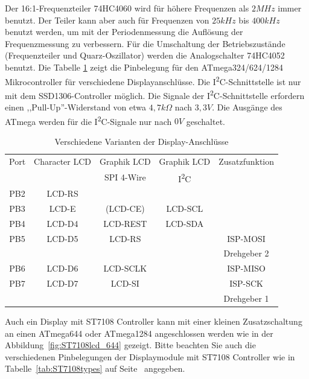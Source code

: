 Der 16:1-Frequenzteiler 74HC4060 wird für höhere Frequenzen als \(2MHz\) immer benutzt.
Der Teiler kann aber auch für Frequenzen von \(25kHz\) bis \(400kHz\) benutzt werden, um mit der
Periodenmessung die Auflösung der Frequenzmessung zu verbessern.
Für die Umschaltung der Betriebszustände (Frequenzteiler und Quarz-Oszillator) werden
die Analogschalter 74HC4052 benutzt.
Die Tabelle \ref{tab:mega644-display} zeigt die Pinbelegung für den ATmega324/624/1284 Mikrocontroller für verschiedene Displayanschlüsse.
Die I\textsuperscript{2}C-Schnittstelle ist nur mit dem SSD1306-Controller möglich.
Die Signale der I\textsuperscript{2}C-Schnittstelle erfordern einen ,,Pull-Up''-Widerstand von etwa \(4,7k\Omega\) nach \(3,3V\).
Die Ausgänge des ATmega werden für die I\textsuperscript{2}C-Signale nur nach \(0V\) geschaltet.


\begin{table}[H]
  \begin{center}
    \begin{tabular}{| c || c | c | c | c |}
    \hline
      Port & Character LCD &  Graphik LCD & Graphik LCD  & Zusatzfunktion      \\
           &               &  SPI 4-Wire  &  I\textsuperscript{2}C         &                     \\
    \hline
    \hline
    PB2    &  LCD-RS         &            &             &       \\
    \hline
    PB3    &  LCD-E          & (LCD-CE)   &  LCD-SCL    &       \\
    \hline
    PB4    &  LCD-D4         & LCD-REST   &  LCD-SDA    &       \\
    \hline
    PB5    &  LCD-D5         & LCD-RS     &             & ISP-MOSI \\
           &                 &            &             & Drehgeber 2 \\
    \hline
    PB6    &  LCD-D6         & LCD-SCLK   &             & ISP-MISO \\
    \hline
    PB7    &  LCD-D7         & LCD-SI     &             & ISP-SCK  \\
           &                 &            &             & Drehgeber 1 \\
    \hline
    \end{tabular}
  \end{center}
  \caption{Verschiedene Varianten der Display-Anschlüsse}
  \label{tab:mega644-display}
\end{table}

Auch ein Display mit ST7108 Controller kann mit einer kleinen Zusatzschaltung an einen
ATmega644 oder ATmega1284 angeschlossen werden wie in der Abbildung~\ref{fig:ST7108lcd_644} gezeigt.
Bitte beachten Sie auch die verschiedenen Pinbelegungen der Displaymodule mit ST7108 Controller wie in
Tabelle~\ref{tab:ST7108types} auf Seite~\pageref{tab:ST7108types} angegeben.

